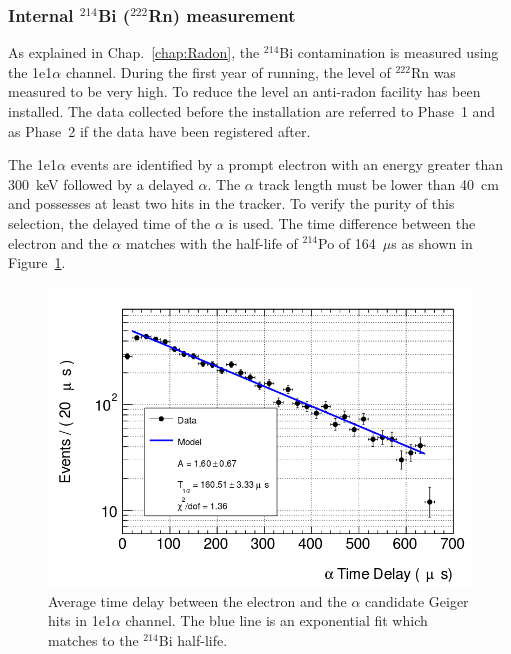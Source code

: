 \documentclass[main.tex]{subfiles}
\begin{document}
\FloatBarrier


\subsubsection{Internal $^{\text{214}}$Bi ($^{\text{222}}$Rn) measurement} \label{sec:1e1aChannel}


\NI As explained in Chap.~\ref{chap:Radon}, the $^{\text{214}}$Bi contamination is measured using the 1e1$\alpha$ channel. During the first year of running, the level of $^{\text{222}}$Rn was measured to be very high. To reduce the level an anti-radon facility has been installed. The data collected before the installation are referred to Phase~1 and as Phase~2 if the data have been registered after.


\bigskip


\NI The 1e1$\alpha$ events are identified by a prompt electron with an energy greater than 300~keV followed by a delayed $\alpha$. The $\alpha$ track length must be lower than 40~cm and possesses at least two hits in the tracker. To verify the purity of this selection, the delayed time of the $\alpha$ is used. The time difference between the electron and the $\alpha$ matches with the half-life of $^{\text{214}}$Po of 164~$\mu$s as shown in Figure~\ref{1e1aChannel_alphaDelayTime}.


\begin{figure}[h!]
\centering
\includegraphics[scale=0.4]{pictures/Chap6/alphaTimeDelay1e1aChannel.png}
\caption{Average time delay between the electron and the $\alpha$ candidate Geiger hits in 1e1$\alpha$ channel. The blue line is an exponential fit which matches to the $^{\text{214}}$Bi half-life.}
\label{1e1aChannel_alphaDelayTime}
\end{figure}
\end{document}
